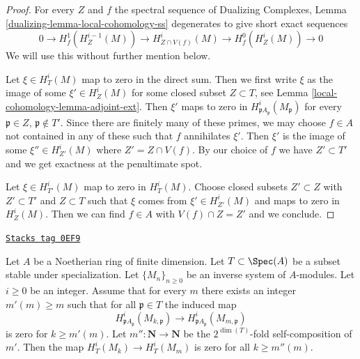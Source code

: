 \begin{proof}
For every $Z$ and $f$ the spectral sequence of
Dualizing Complexes, Lemma \ref{dualizing-lemma-local-cohomology-ss}
degenerates to give short exact sequences
$$
0 \to H^1_f(H^{i - 1}_Z(M)) \to
H^i_{Z \cap V(f)}(M) \to H^0_f(H^i_Z(M)) \to 0
$$
We will use this without further mention below.

\medskip\noindent
Let $\xi \in H^i_T(M)$ map to zero in the direct sum.
Then we first write $\xi$ as the image of some $\xi' \in H^i_Z(M)$
for some closed subset $Z \subset T$, see Lemma \ref{local-cohomology-lemma-adjoint-ext}.
Then $\xi'$ maps to zero in $H^i_{\mathfrak p A_\mathfrak p}(M_\mathfrak p)$
for every $\mathfrak p \in Z$, $\mathfrak p \not \in T'$.
Since there are finitely many of these primes,
we may choose $f \in A$ not contained in any of these
such that $f$ annihilates $\xi'$. Then $\xi'$
is the image of some $\xi'' \in H^i_{Z'}(M)$
where $Z' = Z \cap V(f)$. By our choice of $f$ we have
$Z' \subset T'$ and we get exactness at the penultimate spot.

\medskip\noindent
Let $\xi \in H^i_{T'}(M)$ map to zero in $H^i_T(M)$.
Choose closed subsets $Z' \subset Z$ with $Z' \subset T'$
and $Z \subset T$ such that $\xi$ comes from $\xi' \in H^i_{Z'}(M)$
and maps to zero in $H^i_Z(M)$. Then we can find $f \in A$
with $V(f) \cap Z = Z'$ and we conclude.
\end{proof}

\begin{lemma}[Zero]
\label{local-cohomology-lemma-zero}
\href{https://stacks.math.columbia.edu/tag/0EF9}{\texttt{Stacks tag 0EF9}}

Let $A$ be a Noetherian ring of finite dimension.
Let $T \subset \Spec(A)$ be a subset stable under specialization.
Let $\{M_n\}_{n \geq 0}$ be an inverse system of $A$-modules.
Let $i \geq 0$ be an integer. Assume that for every $m$ there
exists an integer $m'(m) \geq m$ such  that for all
$\mathfrak p \in T$ the induced map
$$
H^i_{\mathfrak p A_\mathfrak p}(M_{k, \mathfrak p})
\longrightarrow
H^i_{\mathfrak p A_\mathfrak p}(M_{m, \mathfrak p})
$$
is zero for $k \geq m'(m)$. Let $m'' : \mathbf{N} \to \mathbf{N}$
be the $2^{\dim(T)}$-fold self-composition of $m'$. Then the map
$H^i_T(M_k) \to H^i_T(M_m)$ is zero for all $k \geq m''(m)$.
\end{lemma}

